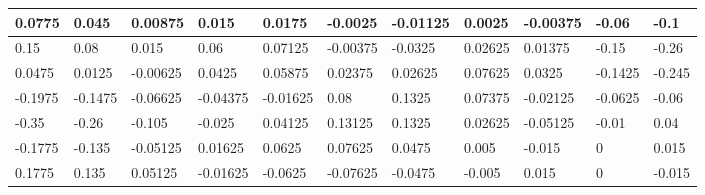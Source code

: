 \begin{tabular}{|l|l|l|l|l|l|l|l|l|l|l|}
\hline
0.0775&0.045&0.00875&0.015&0.0175&-0.0025&-0.01125&0.0025&-0.00375&-0.06&-0.1\\\hline
0.15&0.08&0.015&0.06&0.07125&-0.00375&-0.0325&0.02625&0.01375&-0.15&-0.26\\\hline
0.0475&0.0125&-0.00625&0.0425&0.05875&0.02375&0.02625&0.07625&0.0325&-0.1425&-0.245\\\hline
-0.1975&-0.1475&-0.06625&-0.04375&-0.01625&0.08&0.1325&0.07375&-0.02125&-0.0625&-0.06\\\hline
-0.35&-0.26&-0.105&-0.025&0.04125&0.13125&0.1325&0.02625&-0.05125&-0.01&0.04\\\hline
-0.1775&-0.135&-0.05125&0.01625&0.0625&0.07625&0.0475&0.005&-0.015&0&0.015\\\hline
0.1775&0.135&0.05125&-0.01625&-0.0625&-0.07625&-0.0475&-0.005&0.015&0&-0.015\\\hline
\end{tabular}
